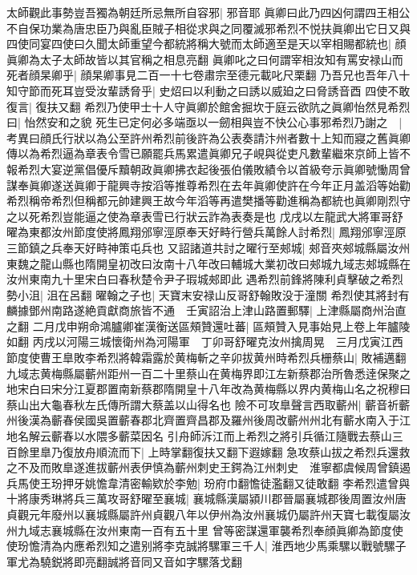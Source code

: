 太師觀此事勢豈吾獨為朝廷所忌無所自容邪|{
	邪音耶}
眞卿曰此乃四凶何謂四王相公不自保功業為唐忠臣乃與亂臣賊子相從求與之同覆滅邪希烈不悦扶眞卿出它日又與四使同宴四使曰久聞太師重望今都統將稱大號而太師適至是天以宰相賜都統也|{
	顔眞卿為太子太師故皆以其官稱之相息亮翻}
眞卿叱之曰何謂宰相汝知有罵安禄山而死者顔杲卿乎|{
	顔杲卿事見二百一十七卷肅宗至德元載叱尺栗翻}
乃吾兄也吾年八十知守節而死耳豈受汝輩誘脅乎|{
	史炤曰以利動之曰誘以威廹之曰脅誘音酉}
四使不敢復言|{
	復扶又翻}
希烈乃使甲士十人守眞卿於館舍掘坎于庭云欲阬之眞卿怡然見希烈曰|{
	怡然安和之貌}
死生已定何必多端亟以一劒相與豈不快公心事邪希烈乃謝之　|{
	考異曰顔氏行狀以為公至許州希烈前後許為公表奏請汴州者數十上知而寢之舊眞卿傳以為希烈逼為章表令雪已願罷兵馬累遣眞卿兄子峴與從吏凡數輩繼來京師上皆不報希烈大宴逆黨倡優斥黷朝政眞卿拂衣起後張伯儀敗績令以首級夸示眞卿號慟周曾謀奉眞卿遂送眞卿于龍興寺按滔等推尊希烈在去年眞卿使許在今年正月盖滔等始勸希烈稱帝希烈但稱都元帥建興王故今年滔等再遣樊播等勸進稱為都統也眞卿剛烈守之以死希烈豈能逼之使為章表雪已行狀云詐為表奏是也}
戊戌以左龍武大將軍哥舒曜為東都汝州節度使將鳳翔邠寧涇原奉天好畤行營兵萬餘人討希烈|{
	鳳翔邠寧涇原三節鎮之兵奉天好畤神策屯兵也}
又詔諸道共討之曜行至郟城|{
	郟音夾郟城縣屬汝州東魏之龍山縣也隋開皇初改曰汝南十八年改曰輔城大業初改曰郟城九域志郟城縣在汝州東南九十里宋白曰春秋楚令尹子瑕城郟即此}
遇希烈前鋒將陳利貞擊破之希烈勢小沮|{
	沮在呂翻}
曜翰之子也|{
	天寶末安禄山反哥舒翰敗没于潼關}
希烈使其將封有麟據鄧州南路遂絶貢獻商旅皆不通　壬寅詔治上津山路置郵驛|{
	上津縣屬商州治直之翻}
二月戊申朔命鴻臚卿崔漢衡送區頰贊還吐蕃|{
	區頰贊入見事始見上卷上年臚陵如翻}
丙戌以河陽三城懷衛州為河陽軍　丁卯哥舒曜克汝州擒周晃　三月戊寅江西節度使曹王臯敗李希烈將韓霜露於黄梅斬之辛卯拔黄州時希烈兵栅蔡山|{
	敗補邁翻九域志黄梅縣屬蘄州距州一百二十里蔡山在黄梅界即江左新蔡郡治所魯悉逹保聚之地宋白曰宋分江夏郡置南新蔡郡隋開皇十八年改為黄梅縣以界内黄梅山名之祝穆曰蔡山出大龜春秋左氏傳所謂大蔡盖以山得名也}
險不可攻臯聲言西取蘄州|{
	蘄音祈蘄州後漢為蘄春侯國吳置蘄春郡北齊置齊昌郡及羅州後周改蘄州州北有蘄水南入于江地名解云蘄春以水隈多蘄菜因名}
引舟師泝江而上希烈之將引兵循江隨戰去蔡山三百餘里臯乃復放舟順流而下|{
	上時掌翻復扶又翻下遐嫁翻}
急攻蔡山拔之希烈兵還救之不及而敗臯遂進拔蘄州表伊慎為蘄州刺史王鍔為江州刺史　淮寧都虞候周曾鎮遏兵馬使王玢押牙姚憺韋清密輸欵於李勉|{
	玢府巾翻憺徒濫翻又徒敢翻}
李希烈遣曾與十將康秀琳將兵三萬攻哥舒曜至襄城|{
	襄城縣漢屬潁川郡晉屬襄城郡後周置汝州唐貞觀元年廢州以襄城縣屬許州貞觀八年以伊州為汝州襄城仍屬許州天寶七載復屬汝州九域志襄城縣在汝州東南一百有五十里}
曾等密謀還軍襲希烈奉顔眞卿為節度使使玢憺清為内應希烈知之遣别將李克誠將騾軍三千人|{
	淮西地少馬乘騾以戰號騾子軍尤為驍鋭將即亮翻誠將音同又音如字騾落戈翻}
